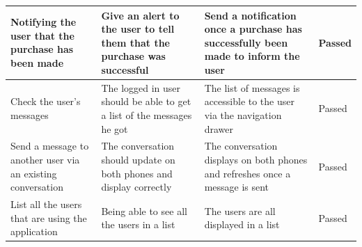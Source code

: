 \documentclass[paper=a4, fontsize=12pt,DIV=14]{scrartcl}    %
\begin{document}
\begin{tabular}{|p{4.3cm}|p{4.3cm}|p{4.3cm}|p{2cm}|}
                \hline
                Notifying the user that the purchase has been made
                & Give an alert to the user to tell them that the purchase was successful
                & Send a notification once a purchase has successfully been made to inform the user
                & Passed\\
                \hline
                Check the user's messages
                & The logged in user should be able to get a list of the messages he got
                & The list of messages is accessible to the user via the navigation drawer
                & Passed\\
                \hline
                Send a message to another user via an existing conversation
                & The conversation should update on both phones and display correctly
                & The conversation displays on both phones and refreshes once a message is sent
                & Passed\\
                \hline
                List all the users that are using the application
                & Being able to see all the users in a list
                & The users are all displayed in a list
                & Passed\\
                \hline
            \end{tabular}
\end{document}
